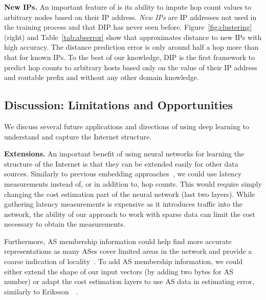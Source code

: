 \textbf{New IPs.} An important feature of \system{} is its ability to impute hop count values to arbitrary nodes based on their IP address. %
{\em New IPs} are IP addresses not used in the training process and that DIP has never seen before.
Figure~\ref{fig:clustering} (right) and Table~\ref{tab:abserror} show that \system{} approximates distance to new IPs with high accuracy. The distance prediction error is only around half a hop more than that for known IPs. To the best of our knowledge, DIP is the first framework to predict hop counts to arbitrary hosts based only on the value of their IP address and routable prefix and without any other domain knowledge.


\subsection{Discussion: Limitations and Opportunities}
\label{dip:discussion}

We discuss several future applications and directions of using deep learning to understand and capture the Internet structure.

\textbf{Extensions.} An important benefit of using neural networks for learning the structure of the Internet is that they can be extended easily for other data sources. 
%
Similarly to previous embedding approaches~\citep{vivaldi,gnp}, we could use latency measurements instead of, or in addition to, hop counts. This would require simply changing the cost estimation part of the neural network (last two layers). While gathering latency measurements is expensive as it introduces traffic into the network, the ability of our approach to work with sparse data can limit the cost necessary to obtain the measurements. 

Furthermore, AS membership information could help find more accurate representations as many ASes cover limited areas in the network and provide a coarse indication of locality~\citep{barford-infocom}. To add AS membership information, we could either extend the shape of our input vectors (by adding two bytes for AS number) or adapt the cost estimation layers to use AS data in estimating error, similarly to Eriksson~\etal~\citep{barford-infocom}.

